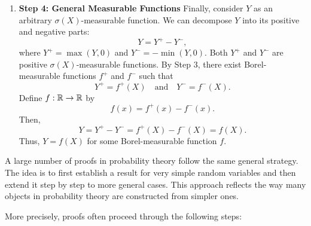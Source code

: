 \documentclass[../Main.tex]{subfiles}
\begin{document}
{\begin{enumerate}
    \item \textbf{ Step 4: General Measurable Functions}
    Finally, consider \( Y \) as an arbitrary \( \sigma(X) \)-measurable function. We can decompose \( Y \) into its positive and negative parts:
    \[ Y = Y^+ - Y^-, \]
    where \( Y^+ = \max(Y, 0) \) and \( Y^- = -\min(Y, 0) \).
    Both \( Y^+ \) and \( Y^- \) are positive \( \sigma(X) \)-measurable functions. By Step 3, there exist Borel-measurable functions \( f^+ \) and \( f^- \) such that
    \[ Y^+ = f^+(X) \quad \text{and} \quad Y^- = f^-(X). \]
    Define \( f : \mathbb{R} \to \mathbb{R} \) by
    \[ f(x) = f^+(x) - f^-(x). \]
    Then,
    \[ Y = Y^+ - Y^- = f^+(X) - f^-(X) = f(X). \]
    Thus, \( Y = f(X) \) for some Borel-measurable function \( f \).
\end{enumerate} }
A large number of proofs in probability theory follow the same general strategy. The idea is to first establish a result for very simple random variables and then extend it step by step to more general cases. This approach reflects the way many objects in probability theory are constructed from simpler ones.

More precisely, proofs often proceed through the following steps:
\end{document}
